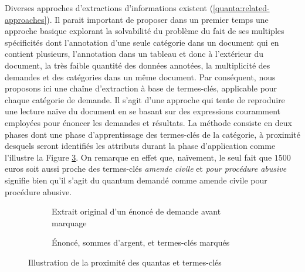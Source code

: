 Diverses approches d'extractions d'informations existent (\ref{quanta:related-approaches}). Il parait important de proposer dans un premier temps une approche basique explorant la solvabilité du problème du fait de ses multiples spécificités dont l'annotation d'une seule catégorie dans un document qui en contient plusieurs, l'annotation dans un tableau et donc à l'extérieur du document, la très faible quantité des données annotées, la multiplicité des demandes et des catégories dans un même document. Par conséquent, nous proposons ici une chaîne d'extraction à base de termes-clés, applicable pour chaque catégorie de demande. Il s'agit d'une approche qui tente de reproduire une lecture naïve du document en se basant sur des expressions couramment employées pour énoncer les demandes et résultats. La méthode consiste en deux phases dont une phase d'apprentissage des termes-clés de la catégorie, à proximité desquels seront identifiés les attributs durant la phase d'application comme l'illustre la Figure \ref{fig:quanta:exemple-proximite}. On remarque en effet que, naïvement, le seul fait que $1500$ euros soit aussi proche des termes-clés \textit{amende civile} et \textit{pour procédure abusive} signifie bien qu'il s'agit du quantum demandé comme amende civile pour procédure abusive.

\begin{figure}[!htb]
	\scriptsize
	\centering
	\begin{subfigure}[t]{0.95\textwidth}
		\caption{Extrait original d'un énoncé de demande avant marquage}\label{fig:quanta:exemple-proximite-original}
	\end{subfigure} 
	
	
	\begin{subfigure}[t]{0.95\textwidth}
		\caption{Énoncé, sommes d'argent, et termes-clés marqués}\label{fig:quanta:exemple-proximite-marquage}
	\end{subfigure}
	\caption{Illustration de la proximité des quantas et termes-clés}
	\label{fig:quanta:exemple-proximite}
\end{figure} 

